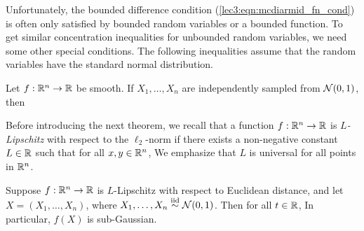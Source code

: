 Unfortunately, the bounded difference condition (\ref{lec3:eqn:mcdiarmid_fn_cond}) is often only satisfied by bounded random variables or a bounded function. To get similar concentration inequalities for unbounded random variables, we need some other special conditions. The following inequalities assume that the random variables have the standard normal distribution.

\begin{theorem}
    Let $f : \mathbb R^n \to \mathbb R$ be smooth. If $X_1, \ldots, X_n$ are independently sampled from $\mathcal N(0, 1)$, then
\end{theorem}

Before introducing the next theorem, we recall that a function $f : \mathbb R^n \to \mathbb R$ is \emph{$L$-Lipschitz} with respect to the $\ell_2$-norm if there exists a non-negative constant $L \in \mathbb R$ such that for all $x, y \in \mathbb R^n$,
We emphasize that $L$ is universal for all points in $\mathbb R^n$.

\begin{theorem}
    Suppose $f : \mathbb R^n \to \mathbb R$ is $L$-Lipschitz with respect to Euclidean distance, and let $X = (X_1, \ldots, X_n)$, where $X_1, \ldots, X_n \overset{\textup{iid}}{\sim} \mathcal N(0, 1)$. Then for all $t \in \mathbb R$,
In particular, $f(X)$ is sub-Gaussian.
\end{theorem}
